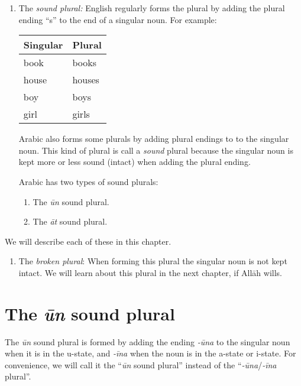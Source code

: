 \documentclass[
  10pt,
]{book}
\providecommand{\tightlist}{%
  \setlength{\itemsep}{0pt}\setlength{\parskip}{0pt}}
\renewcommand{\foreignlanguage}[2]{\oldforeignlanguage{#1}{\smash{#2}}}
\begin{document}
\begin{enumerate}
\def\labelenumi{\arabic{enumi}.}
\item
  The \emph{sound plural:}
  English regularly forms the plural by adding the plural ending \enquote{s} to the end of a singular noun. For example:

  \begin{longtable}[]{@{}ll@{}}
  \toprule\noalign{}
  Singular & Plural \\
  \midrule\noalign{}
  \endhead
  \bottomrule\noalign{}
  \endlastfoot
  book & books \\
  house & houses \\
  boy & boys \\
  girl & girls \\
  \end{longtable}

  Arabic also forms some plurals by adding plural endings to to the singular noun. This kind of plural is call a \emph{sound} plural because the singular noun is kept more or less sound (intact) when adding the plural ending.

  Arabic has two types of sound plurals:

  \begin{enumerate}
  \def\labelenumii{\roman{enumii}.}
  \tightlist
  \item
    The \emph{ūn} sound plural.
  \item
    The \emph{āt} sound plural.
  \end{enumerate}
\end{enumerate}

We will describe each of these in this chapter.

\begin{enumerate}
\def\labelenumi{\arabic{enumi}.}
\setcounter{enumi}{1}
\tightlist
\item
  The \emph{broken plural}: When forming this plural the singular noun is not kept intact. We will learn about this plural in the next chapter, if Allāh wills.
\end{enumerate}

\section{\texorpdfstring{The \emph{ūn} sound plural}{The ūn sound plural}}\label{the-un-sound-plural}

The \emph{ūn} sound plural is formed by adding the ending \foreignlanguage{arabic}{◌ُونَ} \emph{-ūna} to the singular noun when it is in the u-state, and \foreignlanguage{arabic}{◌ِينَ} \emph{-īna} when the noun is in the a-state or i-state. For convenience, we will call it the \enquote{\emph{ūn} sound plural} instead of the \enquote{\emph{-ūna}/\emph{-īna} plural}.
\end{document}
